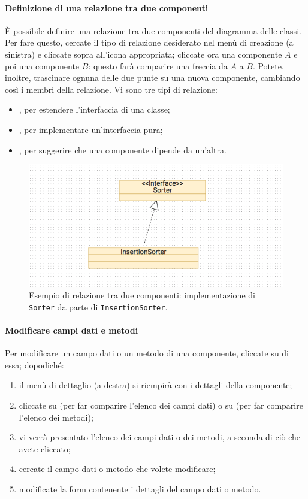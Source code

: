 \paragraph{Definizione di una relazione tra due componenti} È possibile definire una relazione tra due componenti del diagramma delle classi. Per fare questo, cercate il tipo di relazione desiderato nel menù di creazione (a sinistra) e cliccate sopra all'icona appropriata; cliccate ora una componente $A$ e poi una componente $B$: questo farà comparire una freccia da $A$ a $B$. Potete, inoltre, trascinare ognuna delle due punte su una nuova componente, cambiando così i membri della relazione. Vi sono tre tipi di relazione:
\begin{itemize}
	\item {}, per estendere l'interfaccia di una classe;
	\item {}, per implementare un'interfaccia pura;
	\item {}, per suggerire che una componente dipende da un'altra. %
\end{itemize}

\begin{figure}[h]
\centering
	\includegraphics[scale=0.4]{img/relationship}
	\caption{Esempio di relazione tra due componenti: implementazione di \texttt{Sorter} da parte di \texttt{InsertionSorter}.}
	\label{fig:relationship}
\end{figure}

\paragraph{Modificare campi dati e metodi} Per modificare un campo dati o un metodo di una componente, cliccate su di essa; dopodiché:
\begin{enumerate}
	\item il menù di dettaglio (a destra) si riempirà con i dettagli della componente;
	\item cliccate su  (per far comparire l'elenco dei campi dati) o su  (per far comparire l'elenco dei metodi);
	\item vi verrà presentato l'elenco dei campi dati o dei metodi, a seconda di ciò che avete cliccato;
	\item cercate il campo dati o metodo che volete modificare;
	\item modificate la form contenente i dettagli del campo dati o metodo.
\end{enumerate}


